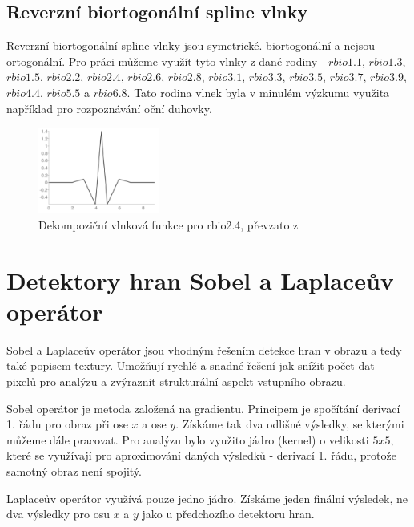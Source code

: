 \subsection{Reverzní biortogonální spline vlnky}
Reverzní biortogonální spline vlnky jsou symetrické. biortogonální a nejsou ortogonální. Pro práci můžeme využít tyto vlnky z dané rodiny - $rbio1.1$, $rbio1.3$, $rbio1.5$, $rbio2.2$, $rbio2.4$, $rbio2.6$, $rbio2.8$, $rbio3.1$, $rbio3.3$, $rbio3.5$, $rbio3.7$, $rbio3.9$, $rbio4.4$, $rbio 5.5$ a $rbio6.8$.\cite{PyWaveletsBrowser} Tato rodina vlnek byla v minulém výzkumu využita například pro rozpoznávání oční duhovky.\cite{IrisRecognition}

\begin{figure}[!htbp]
    \centering
    \includegraphics[width=150px]{obrazky-figures/rbio31wavelet.PNG}
    \caption{Dekompoziční vlnková funkce pro rbio2.4, převzato z \cite{PyWaveletsBrowser}}
\end{figure}

\section{Detektory hran Sobel a Laplaceův operátor}
Sobel a Laplaceův operátor jsou vhodným řešením detekce hran v obrazu a tedy také popisem textury. Umožňují rychlé a snadné řešení jak snížit počet dat - pixelů pro analýzu a zvýraznit strukturální aspekt vstupního obrazu. 

Sobel operátor je metoda založená na gradientu. Principem je spočítání derivací 1. řádu pro obraz při ose $x$ a ose $y$. Získáme tak dva odlišné výsledky, se kterými můžeme dále pracovat. Pro analýzu bylo využito jádro (kernel) o velikosti $5x5$, které se využívají pro aproximování daných výsledků - derivací 1. řádu, protože samotný obraz není spojitý. 

Laplaceův operátor využívá pouze jedno jádro. Získáme jeden finální výsledek, ne dva výsledky pro osu $x$ a $y$ jako u předchozího detektoru hran.\cite{SobelLaplacianDetectors}

